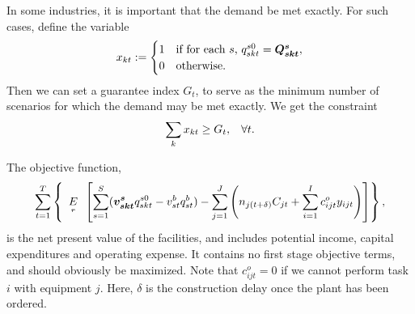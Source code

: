In some industries, it is important that the demand be met exactly.  For such cases, define the variable
\begin{equation*}
x_{kt}:=
	\begin{cases}
		1& \text{if for each $s$, $q^{s0}_{skt} = \mathbf{\boldsymbol{Q^s_{skt}}}$},\\
		0& \text{otherwise}.
	\end{cases}
\end{equation*}
Then we can set a guarantee index $G_t$, to serve as the minimum number of scenarios for which the demand may be met exactly.  We get the constraint
\begin{equation*}
\sum_k x_{kt} \geq G_t, \hspace{3mm} \forall t.
\end{equation*}

The objective function,
\begin{equation*}
\sum_{t=1}^T\left\{ \expect[r]\left[ \sum_{s=1}^S(\rand{v^s_{skt}} q^{s0}_{skt} - v^b_{st}q^b_{st}) - \sum_{j=1}^J\left(n_{j(t+\delta)} C_{jt} + \sum_{i=1}^I c^o_{ijt}y_{ijt}\right)\right] \right\},
\end{equation*}
is the net present value of the facilities, and includes potential income, capital expenditures and operating expense.  It contains no first stage objective terms, and should obviously be maximized.  Note that $c^o_{ijt} = 0$ if we cannot perform task $i$ with equipment $j$.  Here, $\delta$ is the construction delay once the plant has been ordered.



